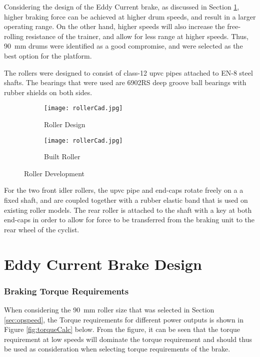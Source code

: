 Considering the design of the Eddy Current brake, as discussed in Section \ref{sec:Eddy}, higher braking force can be achieved at higher drum speeds, and result in a larger operating range. On the other hand, higher speeds will also increase the free-rolling resistance of the trainer, and allow for less range at higher speeds. Thus, \SI{90}{\milli\meter} drums were identified as a good compromise, and were selected as the best option for the platform.

The rollers were designed to consist of class-12 \acf{upvc} pipes attached to EN-8 steel shafts. The bearings that were used are 6902RS deep groove ball bearings with rubber shields on both sides.

\begin{figure}[H]
	\centering
	\begin{subfigure}{.5\textwidth}
		\centering
		\texttt{[image: rollerCad.jpg]}
		\caption{Roller Design}
		\label{fig:rollerCAD}
	\end{subfigure}%
	\begin{subfigure}{.5\textwidth}
		\centering
		\texttt{[image: rollerCad.jpg]}
		\caption{Built Roller}
		\label{fig:rollerBuild}
	\end{subfigure}
	\caption{Roller Development}
	\label{fig:rollerDev}
\end{figure}

For the two front idler rollers, the \ac{upvc} pipe and end-caps rotate freely on a a fixed shaft, and are coupled together with a rubber elastic band that is used on existing roller models. The rear roller is attached to the shaft with a key at both end-caps in order to allow for force to be transferred from the braking unit to the rear wheel of the cyclist.

\newpage

\section{Eddy Current Brake Design}
\label{sec:Eddy}

\subsubsection{Braking Torque Requirements}

When considering the \SI{90}{\milli\meter} roller size that was selected in Section \ref{sec:opspeed}, the Torque requirements for different power outputs is shown in Figure \ref{fig:torqueCalc} below. From the figure, it can be seen that the torque requirement at low speeds will dominate the torque requirement and should thus be used as consideration when selecting torque requirements of the brake.

